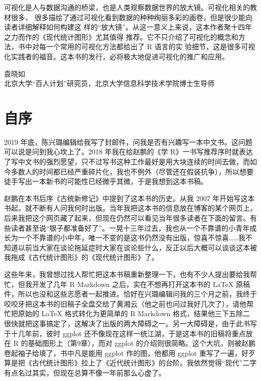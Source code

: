 \documentclass[
  b5paper,
  UTF8,twoside]{book}
\begin{document}
可视化是人与数据沟通的桥梁，也是人类观察数据世界的放大镜。可视化相关的教材很多， 很多描绘了通过可视化看到数据的种种绚丽多彩的画卷，但是很少能向读者详细解释如何构建这 样的``放大镜''。从这一意义上来说，这本作者聚十四年之力而作的《现代统计图形》尤其值得 推荐。它不只介绍了可视化的概念和方法，书中对每一个常用的可视化方法都给出了 R 语言的实 验细节，这是很多可视化实践者的福音。这本书的发行，必将极大地促进可视化的推广和应用。

\begin{flushright}
袁晓如\\
北京大学``百人计划''研究员，北京大学信息科学技术学院博士生导师
\end{flushright}

\hypertarget{preface}{%
\chapter*{自序}\label{preface}}

2019 年底，陈兴璐编辑给我写了封邮件，问我是否有兴趣写一本中文书。这问题可以说是问到我心坎上了。2018 年我在给赵鹏的《学 R》一书写推荐序时就表达了写中文书的强烈愿望，只不过写书这种工作最好是用大块连续的时间去做，而如今多数人的时间都已经严重碎片化，我也不例外（尽管还在假装抗争），所以想要徒手写出一本新书的可能性已经微乎其微，于是我想到这本书稿。

赵鹏在本书后序《古统新修记》中提到了这本书的历史。从我 2007 年开始写这本书起，就不断有人问我何时出版。当年我把这本书的信息放在博客的某个网页上，后来我把这个网页藏了起来，但现在仍然可以看见当年很多读者在下面的留言。有些读者甚至说``银子都准备好了''。一晃十三年过去，我也从一个不靠谱的小青年成长为一个不靠谱的小中年，唯一不变的是这书仍然没有出版，惊喜不惊喜\ldots\ldots 我不知道以前当大家在谈论拖延症时大家在谈论些什么，反正以后大概可以谈谈这本被我拖成《古代统计图形》的《现代统计图形》了。

这些年来，我曾想过找人帮忙把这本书稿重新整理一下，也有不少人提出要给我帮忙，但我开发了几年 R Markdown 之后，实在不想再打开这本书的 LaTeX 原稿件，所以也没和这些志愿者一起推进。恰好在兴璐编辑问我的三个月之前，我终于咬咬牙把这本书的旧稿子全盘交给了黄湘云（他之前也问过我好几次了），请他帮忙把原始的 LaTeX 格式转化为更简单的 R Markdown 格式，结果他三下五除二很快就把这事搞定了，这解决了出版的两大障碍之一。另一大障碍是，由于此书写于十几年前，彼时 ggplot 还不像现在这样一统江湖，于是这本书的旧稿将重点放在 R 的基础图形上（第9章），而对 ggplot 的介绍则很简略。这个大坑，则被赵鹏卷起袖子给填了，书中凡是能用 ggplot 作的图，他都用 ggplot 重写了一遍，好歹算是把《古代统计图形》拉上了《近代统计图形》的台阶。我依然觉得``现代''二字有点名过其实，但现在总算不像一年前那么心虚了。
\end{document}
